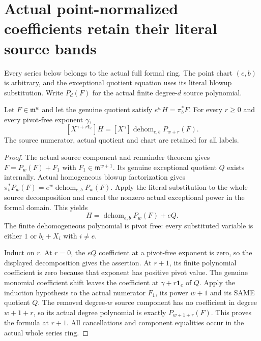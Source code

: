 \section{Actual point-normalized coefficients retain their literal source bands}

Every series below belongs to the actual full formal ring. The point chart
$(e,b)$ is arbitrary, and the exceptional quotient equation uses its literal
blowup substitution. Write $P_d(F)$ for the actual finite degree-$d$
source polynomial.

\begin{theorem}
\label{hir:actual-point-normalized-all-pivot-coefficient-bands}
\leanok
Let $F\in\mathfrak m^w$ and let the genuine quotient satisfy
$e^wH=\pi_b^*F$. For every $r\ge0$ and every pivot-free exponent
$\gamma$,
\[
 [X^{\gamma+r\mathbf1_e}]H
   =[X^\gamma]\operatorname{dehom}_{e,b} P_{w+r}(F).
\]
The source numerator, actual quotient and chart are retained for all labels.
\end{theorem}
\begin{proof}
The actual source component and remainder theorem gives
$F=P_w(F)+F_1$ with $F_1\in\mathfrak m^{w+1}$.
Its genuine exceptional quotient $Q$ exists internally. Actual homogeneous
blowup factorization gives
$\pi_b^*P_w(F)=e^w\operatorname{dehom}_{e,b}P_w(F)$.
Apply the literal substitution to the whole source decomposition and cancel
the nonzero actual exceptional power in the formal domain. This yields
\[
 H=\operatorname{dehom}_{e,b}P_w(F)+eQ.
\]
The finite dehomogeneous polynomial is pivot free: every substituted
variable is either $1$ or $b_i+X_i$ with $i\ne e$.

Induct on $r$. At $r=0$, the $eQ$ coefficient at a pivot-free exponent is
zero, so the displayed decomposition gives the assertion. At $r+1$, its
finite polynomial coefficient is zero because that exponent has positive
pivot value. The genuine monomial coefficient shift leaves the coefficient
at $\gamma+r\mathbf1_e$ of $Q$. Apply the induction hypothesis to
the actual numerator $F_1$, its power $w+1$ and its SAME quotient $Q$.
The removed degree-$w$ source component has no coefficient in degree
$w+1+r$, so its actual degree polynomial is exactly $P_{w+1+r}(F)$.
This proves the formula at $r+1$. All cancellations and component
equalities occur in the actual whole series ring.
\end{proof}


